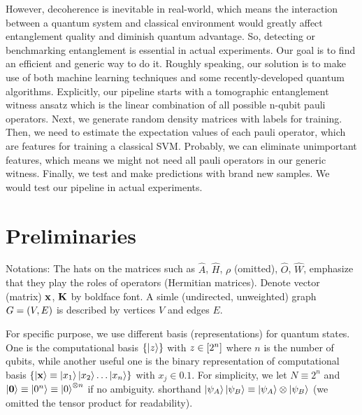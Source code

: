 \documentclass[
10pt,
aps,
pra,
linenumbers,
floatfix,
]{revtex4-2}
\theoremstyle{plain}
\theoremstyle{definition}
\newcommand{\ew}{\hat{W}}
\newcommand{\ob}{\hat{O}}
\newcommand{\hamiltonian}{\hat{H}}
\newcommand{\dm}{\rho}
\begin{document}
However, decoherence is inevitable in real-world, which means the interaction between a quantum system and classical environment would greatly affect entanglement quality and diminish quantum advantage. So, detecting or benchmarking entanglement is essential in actual experiments. Our goal is to find an efficient and generic way to do it. Roughly speaking, our solution is to make use of both machine learning techniques and some recently-developed quantum algorithms.
Explicitly, our pipeline starts with a tomographic entanglement witness ansatz which is the linear combination of all possible n-qubit pauli operators. Next, we generate random density matrices with labels for training. Then, we need to estimate the expectation values of each pauli operator, which are features for training a classical SVM. Probably, we can eliminate unimportant features, which means we might not need all pauli operators in our generic witness. Finally, we test and make predictions with brand new samples. We would test our pipeline in actual experiments. 

\section{Preliminaries}

Notations: 
The hats on the matrices such as $\hat{A}$, $\hamiltonian$, $\dm$ (omitted), $\ob$, $\ew$, emphasize that they play the roles of operators (Hermitian matrices).
Denote vector (matrix) $\vb{x}$, $\vb{K}$ by boldface font.
A simle (undirected, unweighted) graph $G=(V,E)$ is described by vertices $V$ and edges $E$.

For specific purpose, we use different basis (representations) for quantum states.
One is the computational basis $\qty{\ket{z}}$ with $z\in \qty[2^n]$ where $n$ is the number of qubits,
while another useful one is the binary representation of computational basis $\qty{\ket{\vb{x}}\equiv\ket{x_1}\ket{x_2}\dots\ket{x_n}}$ with $x_j\in \qty{0,1}$. 
For simplicity, we let $N \equiv 2^n$ and $\ket{\vb{0}}\equiv\ket{0^n} \equiv\ket{0}^{\otimes n}$ if no ambiguity.
shorthand $\ket{\psi_A}\ket{\psi_B}\equiv \ket{\psi_A}\otimes \ket{\psi_B}$ (we omitted the tensor product for readability).
\end{document}
